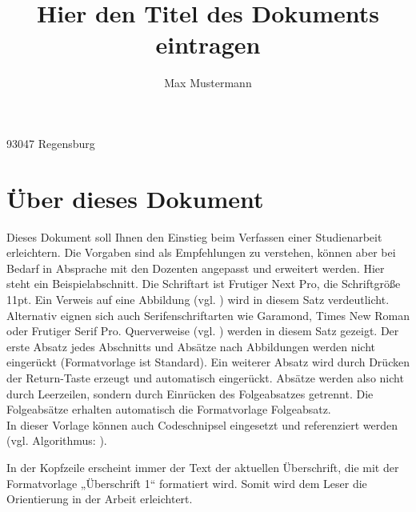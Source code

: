 

\title{Hier den Titel des Dokuments eintragen}
\author{Max Mustermann}
\address{Domplatz 1}{93047 Regensburg}
\writemeta



\maketitle
\thispagestyle{empty} %
\newpage

\pagestyle{fancy}
\fancyhead[R]{\thepage}
\fancyhead[L]{\nouppercase{\leftmark}}

\tableofcontents
\newpage
\listoffigures
\newpage
\lstlistoflistings
\newpage


\section{Über dieses Dokument}
Dieses Dokument soll Ihnen den Einstieg beim Verfassen einer Studienarbeit erleichtern. Die Vorgaben sind als Empfehlungen zu verstehen, können aber bei Bedarf in Absprache mit den Dozenten angepasst und erweitert werden. Hier steht ein Beispielabschnitt. Die Schriftart ist Frutiger Next Pro, die 
Schriftgröße 11pt. Ein Verweis auf eine Abbildung (vgl. ) wird in diesem Satz verdeutlicht. Alternativ eignen sich auch Serifenschriftarten wie Garamond, Times New Roman oder Frutiger Serif Pro. Querverweise (vgl. ) werden in diesem Satz  gezeigt. Der erste Absatz jedes Abschnitts und Absätze nach Abbildungen werden nicht eingerückt (Formatvorlage ist Standard). Ein weiterer Absatz wird durch Drücken der Return-Taste erzeugt und automatisch eingerückt. Absätze werden also nicht durch Leerzeilen, sondern durch Einrücken des Folgeabsatzes getrennt. Die Folgeabsätze erhalten automatisch die Formatvorlage Folgeabsatz.\\

In dieser Vorlage können auch Codeschnipsel eingesetzt und referenziert werden (vgl. Algorithmus: ).

In der Kopfzeile erscheint immer der Text der aktuellen Überschrift, die mit der Formatvorlage „Überschrift 1“ formatiert wird. Somit wird dem Leser die Orientierung in der Arbeit erleichtert.\\


